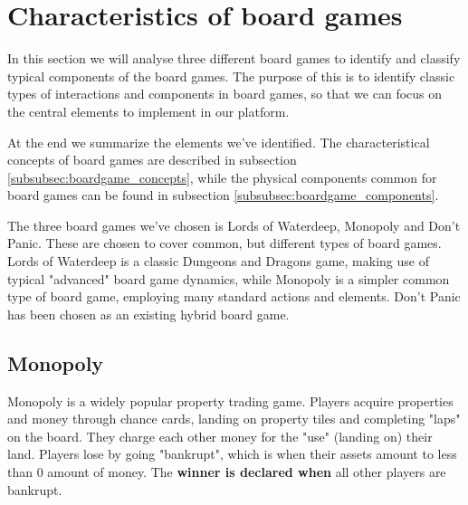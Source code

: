 \section{Characteristics of board games} \label{sec:boardgames_commonalities}

In this section we will analyse three different board games to identify and classify typical components of the board games. The purpose of this is to identify classic types of interactions and components in board games, so that we can focus on the central elements to implement in our platform. 

At the end we summarize the elements we've identified. The characteristical concepts of board games are described in subsection \ref{subsubsec:boardgame_concepts}, while the physical components common for board games can be found in subsection \ref{subsubsec:boardgame_components}. 

The three board games we've chosen is Lords of Waterdeep, Monopoly and Don't Panic. These are chosen to cover common, but different types of board games. Lords of Waterdeep is a classic Dungeons and Dragons game, making use of typical "advanced" board game dynamics, while Monopoly is a simpler common type of board game, employing many standard actions and elements. Don't Panic has been chosen as an existing hybrid board game.

\subsection{Monopoly}
Monopoly is a widely popular property trading game. Players acquire properties and money through chance cards, landing on property tiles and completing "laps" on the board. They charge each other money for the "use" (landing on) their land. Players lose by going "bankrupt", which is when their assets amount to less than 0 amount of money. The \textbf{winner is declared when} all other players are bankrupt.

